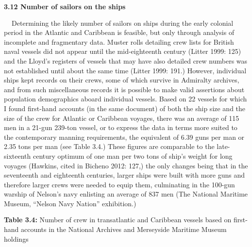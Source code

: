 \begin{styleStandard}
\textbf{3.12 Number of sailors on the ships}
\end{styleStandard}


\begin{styleStandard}
\textbf{\ \ }Determining the likely number of sailors on ships during the early colonial period in the Atlantic and Caribbean is feasible, but only through analysis of incomplete and fragmentary data. Muster rolls detailing crew lists for British naval vessels did not appear until the mid-eighteenth century (Litter 1999: 125) and the Lloyd’s registers of vessels that may have also detailed crew numbers was not established until about the same time (Litter 1999: 191.) However, individual ships kept records on their crews, some of which survive in Admiralty archives, and from such miscellaneous records it is possible to make valid assertions about population demographics aboard individual vessels. Based on 22 vessels for which I found first-hand accounts (in the same document) of both the ship size and the size of the crew for Atlantic or Caribbean voyages, there was an average of 115 men in a 21-gun 239-ton vessel, or to express the data in terms more suited to the contemporary manning requirements, the equivalent of 6.39 guns per man or 2.35 tons per man (see Table 3.4.) These figures are comparable to the late-sixteenth century optimum of one man per two tons of ship’s weight for long voyages (Hawkins, cited in Bicheno 2012: 127,) the only changes being that in the seventeenth and eighteenth centuries, larger ships were built with more guns and therefore larger crews were needed to equip them, culminating in the 100-gun warship of Nelson’s navy enlisting an average of 837 men (The National Maritime Museum, “Nelson Navy Nation” exhibition.)
\end{styleStandard}


\clearpage\begin{styleStandard}
\textbf{Table 3.4:} Number of crew in transatlantic and Caribbean vessels based on first-hand accounts in the National Archives and Merseyside Maritime Museum holdings
\end{styleStandard}


